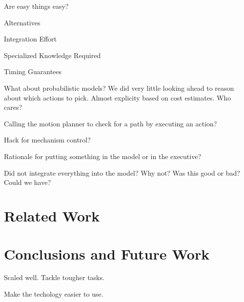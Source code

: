 \documentclass[letterpaper]{article}
\begin{document}
Are easy things easy?

Alternatives

Integration Effort

Specialized Knowledge Required

Timing Guarantees

What about probabilistic models? We did very little looking ahead to reason about which actions to pick. Almost explicity based on cost estimates. Who cares?

Calling the motion planner to check for a path by executing an action?

Hack for mechanism control?

Rationale for putting something in the model or in the executive?

Did not integrate everything into the model? Why not? Was this good or bad? Could we have?

\section{Related Work}

\section{Conclusions and Future Work}
Scaled well.
Tackle tougher tasks.

Make the techology easier to use.
\end{document}
